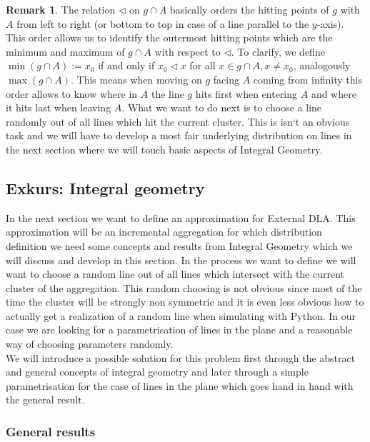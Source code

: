 \documentclass[12pt,a4paper]{scrartcl}
\numberwithin{equation}{subsection}
\newcommand{\1}{\mathbbm{1}}
\numberwithin{equation}{section}
\theoremstyle{definition}
\newtheorem{remark}{Remark}[subsection]
\begin{document}
\begin{remark}
	The relation $\triangleleft$ on $g\cap A$ basically orders the hitting points of $g$ with $A$ from left to right (or bottom to top in case of a line parallel to the $y$-axis). This order allows us to identify the outermost hitting points which are the minimum and maximum of $g\cap A$ with respect to $\triangleleft$. To clarify, we define $\min (g\cap A) := x_0$ if and only if $x_0 \triangleleft x$ for all $x\in g\cap A,x\neq x_0$, analogously $\max(g\cap A)$. This means when moving on $g$ facing $A$ coming from infinity this order allows to know where in $A$ the line $g$ hits first when \glqq entering \grqq $A$ and where it hits last when \glqq leaving \grqq $A$. What we want to do next is to choose a line randomly out of all lines which hit the current cluster. This is isn`t an obvious task and we will have to develop a most fair underlying distribution on lines in the next section where we will touch basic aspects of Integral Geometry. 
\end{remark}






\subsection{Exkurs: Integral geometry}

In the next section we want to define an approximation for External DLA. This approximation will be an incremental aggregation for which distribution definition we need some concepts and results from Integral Geometry which we will discuss and develop in this section. In the process we want to define we will want to choose a random line out of all lines which intersect with the current cluster of the aggregation. This random choosing is not obvious since most of the time the cluster will be strongly non symmetric and it is even less obvious how to actually get a realization of a random line when simulating with Python. In our case we are looking for a parametrisation of lines in the plane and a reasonable way of choosing parameters randomly. \\

We will introduce a possible solution for this problem first through the abstract and general concepts of integral geometry and later through a simple parametrisation for the case of lines in the plane which goes hand in hand with the general result.

\subsubsection{General results}
\end{document}
